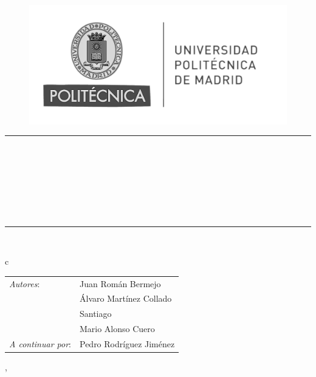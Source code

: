 \begin{titlepage}
	\begin{center}
		\vspace*{0in}
		\begin{figure}[htb]
			\centering
			\includegraphics[width = 0.6\linewidth]{./Figures/Portada_HF/upm_logo.png}
		\end{figure}
		
		\vspace*{0.2in}
		\rule{\linewidth}{0.4mm}\\
		\vspace*{0.1in}
		\begin{huge}
			\textbf{\scshape{\ProjectTitle}} \\
		\end{huge}
		\vspace*{0.1in}
		\begin{large}
			\begin{normalsize}
				\scshape{\Project}\\
				\scshape{\ProjectSubject}
			\end{normalsize}
		\end{large} \\
  
		\vspace*{1em}
		\rule{\linewidth}{0.4mm}\\
		\vspace*{0.1in}
		\begin{large}
			\begin{tabular}{c}
				\\
				\begin{tabular}{ l l }
					\textit{Autores}: & Juan Román Bermejo       \\
					                   & Álvaro Martínez Collado  \\
                                          & Santiago                 \\
                                          & Mario Alonso Cuero       \\
                        \textit{A continuar por}: & Pedro Rodríguez Jiménez       \\
				\end{tabular}
				
				
			\end{tabular}
		\end{large}

  
		\vspace*{2in}
		\begin{large}
			\textsc{\ProjectLocation, \ProjectDate}
		\end{large}
	\end{center}
	
	
	\afterpage{\blankpage}      %
	
\end{titlepage}
